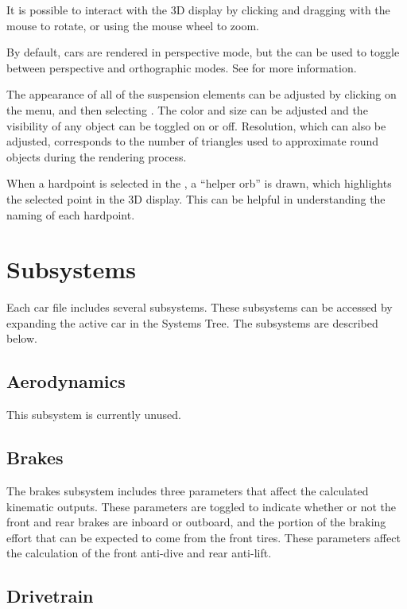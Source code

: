 It is possible to interact with the 3D display by clicking and dragging with the mouse to rotate, or using the mouse wheel to zoom.

By default, cars are rendered in perspective mode, but the  can be used to toggle between perspective and orthographic modes.  See  for more information.

The appearance of all of the suspension elements can be adjusted by clicking on the  menu, and then selecting .  The color and size can be adjusted and the visibility of any object can be toggled on or off.  Resolution, which can also be adjusted, corresponds to the number of triangles used to approximate round objects during the rendering process.

When a hardpoint is selected in the , a ``helper orb'' is drawn, which highlights the selected point in the 3D display.  This can be helpful in understanding the naming of each hardpoint.

\section{Subsystems} \label{sec:subsystems}

Each car file includes several subsystems.  These subsystems can be accessed by expanding the active car in the Systems Tree.  The subsystems are described below.

\subsection{Aerodynamics} \label{ssec:aerodynamics}

This subsystem is currently unused.

\subsection{Brakes} \label{ssec:brakes}

The brakes subsystem includes three parameters that affect the calculated kinematic outputs.  These parameters are toggled to indicate whether or not the front and rear brakes are inboard or outboard, and the portion of the braking effort that can be expected to come from the front tires.  These parameters affect the calculation of the front anti-dive and rear anti-lift.

\subsection{Drivetrain} \label{ssec:drivetrain}

